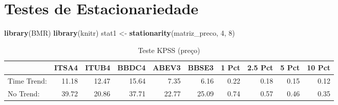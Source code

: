 \documentclass[]{article}
\newenvironment{Shaded}{\begin{snugshade}}{\end{snugshade}}
\newcommand{\KeywordTok}[1]{\textcolor[rgb]{0.13,0.29,0.53}{\textbf{{#1}}}}
\newcommand{\DataTypeTok}[1]{\textcolor[rgb]{0.13,0.29,0.53}{{#1}}}
\newcommand{\DecValTok}[1]{\textcolor[rgb]{0.00,0.00,0.81}{{#1}}}
\newcommand{\StringTok}[1]{\textcolor[rgb]{0.31,0.60,0.02}{{#1}}}
\newcommand{\OtherTok}[1]{\textcolor[rgb]{0.56,0.35,0.01}{{#1}}}
\newcommand{\NormalTok}[1]{{#1}}
\begin{document}
\section{Testes de Estacionariedade}\label{testes-de-estacionariedade}

\begin{Shaded}
\begin{Highlighting}[]
\KeywordTok{library}\NormalTok{(BMR)}
\KeywordTok{library}\NormalTok{(knitr)}
\NormalTok{stat1 <-}\StringTok{ }\KeywordTok{stationarity}\NormalTok{(matriz_preco, }\DecValTok{4}\NormalTok{, }\DecValTok{8}\NormalTok{)}
\end{Highlighting}
\end{Shaded}

\begin{Shaded}
\end{Shaded}

\begin{longtable}[t]{lrrrrrrrrr}
\caption{\label{tab:unnamed-chunk-10}Teste KPSS (preço)}\\
\toprule
  & ITSA4 & ITUB4 & BBDC4 & ABEV3 & BBSE3 & 1 Pct & 2.5 Pct & 5 Pct & 10 Pct\\
\midrule
Time Trend: & 11.18 & 12.47 & 15.64 & 7.35 & 6.16 & 0.22 & 0.18 & 0.15 & 0.12\\
No Trend: & 39.72 & 20.86 & 37.71 & 22.77 & 25.09 & 0.74 & 0.57 & 0.46 & 0.35\\
\bottomrule
\end{longtable}

\begin{Shaded}
\end{Shaded}
\end{document}

